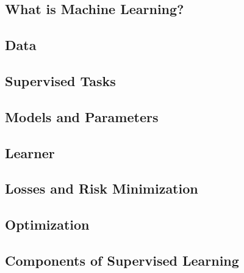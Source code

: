 


\subsection{What is Machine Learning?}


\subsection{Data}


\subsection{Supervised Tasks}


\subsection{Models and Parameters}


\subsection{Learner}


\subsection{Losses and Risk Minimization}


\subsection{Optimization}


\subsection{Components of Supervised Learning}


